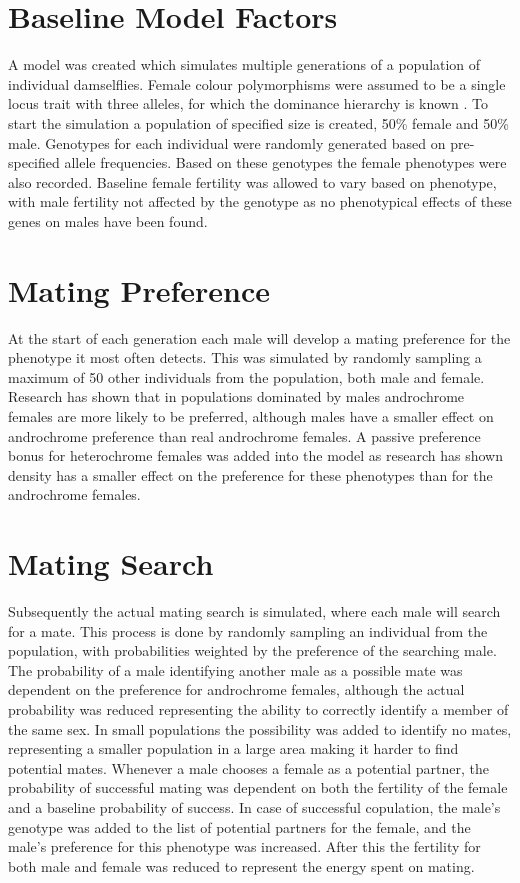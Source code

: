 \documentclass{article}
\begin{document}
\section{Baseline Model Factors}
A model was created which simulates multiple generations of a population of individual damselflies. Female colour polymorphisms were assumed to be a single locus trait with three alleles, for which the dominance hierarchy is known \cite{Cordero1990}. To start the simulation a population of specified size is created, 50\% female and 50\% male. Genotypes for each individual were randomly generated based on pre-specified allele frequencies. Based on these genotypes the female phenotypes were also recorded. Baseline female fertility was allowed to vary based on phenotype, with male fertility not affected by the genotype as no phenotypical effects of these genes on males have been found.

\section{Mating Preference}
At the start of each generation each male will develop a mating preference for the phenotype it most often detects. This was simulated by randomly sampling a maximum of 50 other individuals from the population, both male and female. Research has shown that in populations dominated by males androchrome females are more likely to be preferred\cite{}, although males have a smaller effect on androchrome preference than real androchrome females. A passive preference bonus for heterochrome females was added into the model as research has shown density has a smaller effect on the preference for these phenotypes than for the androchrome females.

\section{Mating Search}
Subsequently the actual mating search is simulated, where each male will search for a mate. This process is done by randomly sampling an individual from the population, with probabilities weighted by the preference of the searching male. The probability of a male identifying another male as a possible mate was dependent on the preference for androchrome females, although the actual probability was reduced representing the ability to correctly identify a member of the same sex. In small populations the possibility was added to identify no mates, representing a smaller population in a large area making it harder to find potential mates. Whenever a male chooses a female as a potential partner, the probability of successful mating was dependent on both the fertility of the female and a baseline probability of success. In case of successful copulation, the male's genotype was added to the list of potential partners for the female, and the male's preference for this phenotype was increased. After this the fertility for both male and female was reduced to represent the energy spent on mating.
\end{document}
